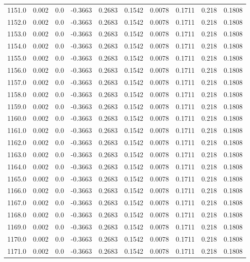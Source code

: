 \begin{longtable}{lrrrrrrrrr}
1151.0 & 0.002 & 0.0 & -0.3663 & 0.2683 & 0.1542 & 0.0078 & 0.1711 & 0.218 & 0.1808 \\
1152.0 & 0.002 & 0.0 & -0.3663 & 0.2683 & 0.1542 & 0.0078 & 0.1711 & 0.218 & 0.1808 \\
1153.0 & 0.002 & 0.0 & -0.3663 & 0.2683 & 0.1542 & 0.0078 & 0.1711 & 0.218 & 0.1808 \\
1154.0 & 0.002 & 0.0 & -0.3663 & 0.2683 & 0.1542 & 0.0078 & 0.1711 & 0.218 & 0.1808 \\
1155.0 & 0.002 & 0.0 & -0.3663 & 0.2683 & 0.1542 & 0.0078 & 0.1711 & 0.218 & 0.1808 \\
1156.0 & 0.002 & 0.0 & -0.3663 & 0.2683 & 0.1542 & 0.0078 & 0.1711 & 0.218 & 0.1808 \\
1157.0 & 0.002 & 0.0 & -0.3663 & 0.2683 & 0.1542 & 0.0078 & 0.1711 & 0.218 & 0.1808 \\
1158.0 & 0.002 & 0.0 & -0.3663 & 0.2683 & 0.1542 & 0.0078 & 0.1711 & 0.218 & 0.1808 \\
1159.0 & 0.002 & 0.0 & -0.3663 & 0.2683 & 0.1542 & 0.0078 & 0.1711 & 0.218 & 0.1808 \\
1160.0 & 0.002 & 0.0 & -0.3663 & 0.2683 & 0.1542 & 0.0078 & 0.1711 & 0.218 & 0.1808 \\
1161.0 & 0.002 & 0.0 & -0.3663 & 0.2683 & 0.1542 & 0.0078 & 0.1711 & 0.218 & 0.1808 \\
1162.0 & 0.002 & 0.0 & -0.3663 & 0.2683 & 0.1542 & 0.0078 & 0.1711 & 0.218 & 0.1808 \\
1163.0 & 0.002 & 0.0 & -0.3663 & 0.2683 & 0.1542 & 0.0078 & 0.1711 & 0.218 & 0.1808 \\
1164.0 & 0.002 & 0.0 & -0.3663 & 0.2683 & 0.1542 & 0.0078 & 0.1711 & 0.218 & 0.1808 \\
1165.0 & 0.002 & 0.0 & -0.3663 & 0.2683 & 0.1542 & 0.0078 & 0.1711 & 0.218 & 0.1808 \\
1166.0 & 0.002 & 0.0 & -0.3663 & 0.2683 & 0.1542 & 0.0078 & 0.1711 & 0.218 & 0.1808 \\
1167.0 & 0.002 & 0.0 & -0.3663 & 0.2683 & 0.1542 & 0.0078 & 0.1711 & 0.218 & 0.1808 \\
1168.0 & 0.002 & 0.0 & -0.3663 & 0.2683 & 0.1542 & 0.0078 & 0.1711 & 0.218 & 0.1808 \\
1169.0 & 0.002 & 0.0 & -0.3663 & 0.2683 & 0.1542 & 0.0078 & 0.1711 & 0.218 & 0.1808 \\
1170.0 & 0.002 & 0.0 & -0.3663 & 0.2683 & 0.1542 & 0.0078 & 0.1711 & 0.218 & 0.1808 \\
1171.0 & 0.002 & 0.0 & -0.3663 & 0.2683 & 0.1542 & 0.0078 & 0.1711 & 0.218 & 0.1808 \\

\end{longtable}
